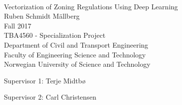 
\thispagestyle{empty}
\mbox{}\\[6pc]
\begin{center}
\Huge{Vectorization of Zoning Regulations Using Deep Learning}\\[2pc]

\Large{Ruben Schmidt Mällberg}\\[1pc]
\large{Fall 2017}\\[2pc]

TBA4560 - Specialization Project\\
Department of Civil and Transport Engineering \\
Faculty of Engineering Science and Technology\\
Norwegian University of Science and Technology
\end{center}
\vfill

\noindent Supervisor 1: Terje Midtbø

\noindent Supervisor 2: Carl Christensen

